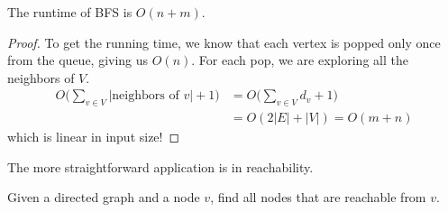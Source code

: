   \begin{theorem}
    The runtime of BFS is $O(n+m)$. 
  \end{theorem}
  \begin{proof}
    To get the running time, we know that each vertex is popped only once from the queue, giving us $O(n)$. For each pop, we are exploring all the neighbors of $V$. 
    \begin{align}
      O \bigg( \sum_{v \in V} | \text{neighbors of } v| + 1\bigg) & = O \bigg( \sum_{v \in V} d_v + 1 \bigg) \\
                                           & = O (2 |E| + |V|) = O(m + n )
    \end{align}
    which is linear in input size!  
  \end{proof}

  The more straightforward application is in reachability. 

  \begin{example}[Reachability]
    Given a directed graph and a node $v$, find all nodes that are reachable from $v$. 
  \end{example}

